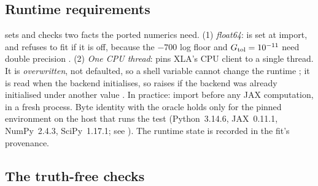 \subsection{Runtime requirements}\label{sec:pv-runtime}

 sets and checks two facts the ported numerics need. (1) \emph{float64}:
 is set at import, and  refuses to fit if it is off, because the $-700$ log
floor and $G_{\rm tol}=10^{-11}$ need double precision . (2)
\emph{One CPU thread}:  pins XLA's CPU client to a single thread. It is
\emph{overwritten}, not defaulted, so a shell variable cannot change the runtime
; it is read when the backend initialises, so  raises
 if the backend was already initialised under another value
. In practice: import  before any JAX computation, in a fresh
process. Byte identity with the oracle holds only for the pinned environment on the host that runs the test
(Python~3.14.6, JAX~0.11.1, NumPy~2.4.3, SciPy~1.17.1; see ). The
runtime state is recorded in the fit's provenance.

\subsection{The truth-free checks}\label{sec:pv-checks}

